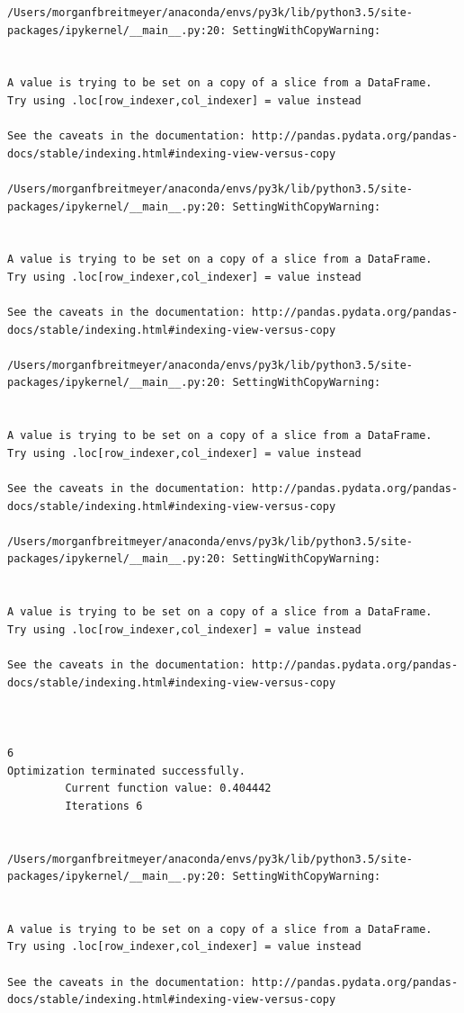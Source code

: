 \begin{lstlisting}
/Users/morganfbreitmeyer/anaconda/envs/py3k/lib/python3.5/site-packages/ipykernel/__main__.py:20: SettingWithCopyWarning:


A value is trying to be set on a copy of a slice from a DataFrame.
Try using .loc[row_indexer,col_indexer] = value instead

See the caveats in the documentation: http://pandas.pydata.org/pandas-docs/stable/indexing.html#indexing-view-versus-copy

/Users/morganfbreitmeyer/anaconda/envs/py3k/lib/python3.5/site-packages/ipykernel/__main__.py:20: SettingWithCopyWarning:


A value is trying to be set on a copy of a slice from a DataFrame.
Try using .loc[row_indexer,col_indexer] = value instead

See the caveats in the documentation: http://pandas.pydata.org/pandas-docs/stable/indexing.html#indexing-view-versus-copy

/Users/morganfbreitmeyer/anaconda/envs/py3k/lib/python3.5/site-packages/ipykernel/__main__.py:20: SettingWithCopyWarning:


A value is trying to be set on a copy of a slice from a DataFrame.
Try using .loc[row_indexer,col_indexer] = value instead

See the caveats in the documentation: http://pandas.pydata.org/pandas-docs/stable/indexing.html#indexing-view-versus-copy

/Users/morganfbreitmeyer/anaconda/envs/py3k/lib/python3.5/site-packages/ipykernel/__main__.py:20: SettingWithCopyWarning:


A value is trying to be set on a copy of a slice from a DataFrame.
Try using .loc[row_indexer,col_indexer] = value instead

See the caveats in the documentation: http://pandas.pydata.org/pandas-docs/stable/indexing.html#indexing-view-versus-copy



6
Optimization terminated successfully.
         Current function value: 0.404442
         Iterations 6


/Users/morganfbreitmeyer/anaconda/envs/py3k/lib/python3.5/site-packages/ipykernel/__main__.py:20: SettingWithCopyWarning:


A value is trying to be set on a copy of a slice from a DataFrame.
Try using .loc[row_indexer,col_indexer] = value instead

See the caveats in the documentation: http://pandas.pydata.org/pandas-docs/stable/indexing.html#indexing-view-versus-copy


\end{lstlisting}
